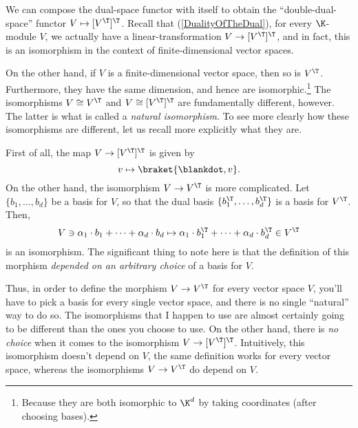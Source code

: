 We can compose the dual-space functor with itself to obtain the ``double-dual-space'' functor $V\mapsto [V^{\T}]^{\T}$.  Recall that (\cref{DualityOfTheDual}), for every $\K$-module $V$, we actually have a linear-transformation $V\rightarrow [V^{\T}]^{\T}$, and in fact, this is an isomorphism in the context of finite-dimensional vector spaces.

On the other hand, if $V$ is a finite-dimensional vector space, then so is $V^{\T}$.  Furthermore, they have the same dimension, and hence are isomorphic.\footnote{Because they are both isomorphic to $\K ^d$ by taking coordinates (after choosing bases).}  The isomorphisms $V\cong V^{\T}$ and $V\cong [V^{\T}]^{\T}$ are fundamentally different, however.  The latter is what is called a \emph{natural isomorphism}.  To see more clearly how these isomorphisms are different, let us recall more explicitly what they are.

First of all, the map $V\rightarrow [V^{\T}]^{\T}$ is given by
\begin{equation}
v\mapsto \braket{\blankdot ,v}.
\end{equation}
On the other hand, the isomorphism $V\rightarrow V^{\T}$ is more complicated.  Let $\{ b_1,\ldots ,b_d\}$ be a basis for $V$, so that the dual basis $\{ b_1^{\T},\ldots ,b_d^{\T}\}$ is a basis for $V^{\T}$.  Then,
\begin{equation}
V\ni \alpha _1\cdot b_1+\cdots +\alpha _d\cdot b_d\mapsto \alpha _1\cdot b_1^{\T}+\cdots +\alpha _d\cdot b_d^{\T}\in V^{\T}
\end{equation}
is an isomorphism.  The significant thing to note here is that the definition of this morphism \emph{depended on an arbitrary choice} of a basis for $V$.

Thus, in order to define the morphism $V\rightarrow V^{\T}$ for every vector space $V$, you'll have to pick a basis for every single vector space, and there is no single ``natural'' way to do so.  The isomorphisms that I happen to use are almost certainly going to be different than the ones you choose to use.  On the other hand, there is \emph{no choice} when it comes to the isomorphism $V\rightarrow [V^{\T}]^{\T}$.  Intuitively, this isomorphism doesn't depend on $V$, the same definition works for every vector space, whereas the isomorphisms $V\rightarrow V^{\T}$ do depend on $V$.

